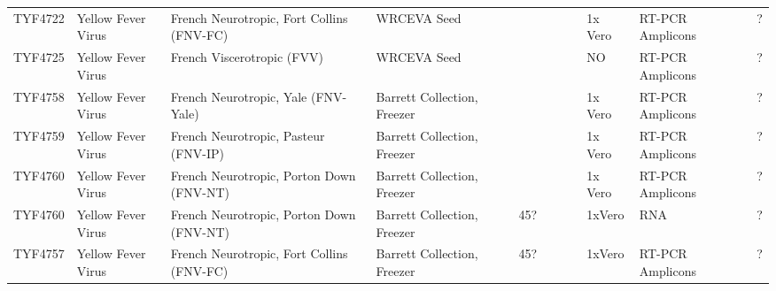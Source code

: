 \begin{longtable}{@{}lllllllllllll@{}}
TYF4722        & Yellow Fever Virus & French Neurotropic, Fort Collins (FNV-FC) & WRCEVA Seed                            &             &                         &                       &           &          & 1x Vero                     & RT-PCR Amplicons   &                                                                                                  & ?                          \\
TYF4725        & Yellow Fever Virus & French Viscerotropic (FVV)                & WRCEVA Seed                            &             &                         &                       &           &          & NO                          & RT-PCR Amplicons   &                                                                                                  & ?                          \\
TYF4758        & Yellow Fever Virus & French Neurotropic, Yale (FNV-Yale)       & Barrett Collection, Freezer            &             &                         &                       &           &          & 1x Vero                     & RT-PCR Amplicons   &                                                                                                  & ?                          \\
TYF4759        & Yellow Fever Virus & French Neurotropic, Pasteur (FNV-IP)      & Barrett Collection, Freezer            &             &                         &                       &           &          & 1x Vero                     & RT-PCR Amplicons   &                                                                                                  & ?                          \\
TYF4760        & Yellow Fever Virus & French Neurotropic, Porton Down (FNV-NT)  & Barrett Collection, Freezer            &             &                         &                       &           &          & 1x Vero                     & RT-PCR Amplicons   &                                                                                                  & ?                          \\
TYF4760        & Yellow Fever Virus & French Neurotropic, Porton Down (FNV-NT)  & Barrett Collection, Freezer            &             & 45?                     &                       &           &          & 1xVero                      & RNA                &                                                                                                  & ?                          \\
TYF4757        & Yellow Fever Virus & French Neurotropic, Fort Collins (FNV-FC) & Barrett Collection, Freezer            &             & 45?                     &                       &           &          & 1xVero                      & RT-PCR Amplicons   &                                                                                                  & ?                          \\

\end{longtable}
